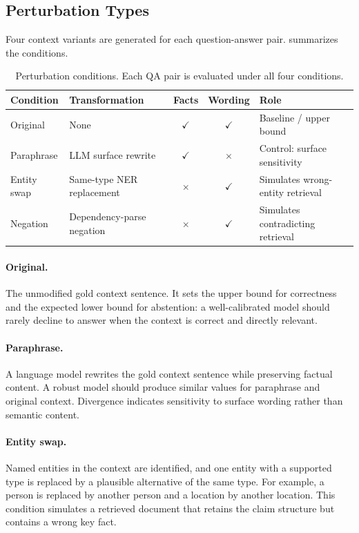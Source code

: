 \documentclass[11pt]{article}
\begin{document}
\subsection{Perturbation Types}

Four context variants are generated for each question-answer pair. 
summarizes the conditions.

\begin{table}[htbp]
\centering
\caption{Perturbation conditions. Each QA pair is evaluated under all four conditions.}
\label{tab:perturbations}
\begin{tabular}{llccL{3.5cm}}
\toprule
\textbf{Condition} & \textbf{Transformation} & \textbf{Facts} & \textbf{Wording} & \textbf{Role} \\
\midrule
Original    & None                        & $\checkmark$ & $\checkmark$ & Baseline / upper bound \\
Paraphrase  & LLM surface rewrite         & $\checkmark$ & $\times$     & Control: surface sensitivity \\
Entity swap & Same-type NER replacement   & $\times$     & $\checkmark$ & Simulates wrong-entity retrieval \\
Negation    & Dependency-parse negation   & $\times$     & $\checkmark$ & Simulates contradicting retrieval \\
\bottomrule
\end{tabular}
\end{table}

\paragraph{Original.} The unmodified gold context sentence. It sets the upper bound for
correctness and the expected lower bound for abstention: a well-calibrated model should
rarely decline to answer when the context is correct and directly relevant.

\paragraph{Paraphrase.} A language model rewrites the gold context sentence while
preserving factual content. A robust model should produce similar values for paraphrase
and original context. Divergence indicates sensitivity to surface wording rather than
semantic content.

\paragraph{Entity swap.} Named entities in the context are identified, and one entity
with a supported type is replaced by a plausible alternative of the same type. For
example, a person is replaced by another person and a location by another location. This
condition simulates a retrieved document that retains the claim structure but contains a
wrong key fact.
\end{document}
